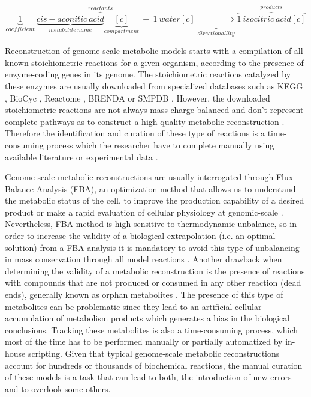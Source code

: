 \begin{equation}
\label{eq:biochemicalReaction}
\overbrace{\underbrace{1}_{coefficient}\ \underbrace{cis-aconitic\ acid}_{metabolite\ name}\underbrace{[c]}_{compartment}\ +\ 1\ water[c]}^{reactants} \underbrace{\Rightarrow}_{directionallity} \overbrace{1\ isocitric\ acid[c]}^{products}
\end{equation}

Reconstruction of genome-scale metabolic models starts with a compilation of all known stoichiometric reactions for a given organism, according to the presence of enzyme-coding genes in its genome. The stoichiometric reactions catalyzed by these enzymes are usually downloaded from specialized databases such as KEGG \citep{Kanehisa2000}, BioCyc \citep{Caspi2014}, Reactome \citep{Croft2014}, BRENDA \citep{Chang2015} or SMPDB \citep{Jewison2014}. However, the downloaded stoichiometric reactions are not always mass-charge balanced and don't represent complete pathways as to construct a high-quality metabolic reconstruction \citep{Thiele2010, Gevorgyan2008}. Therefore the identification and curation of these type of reactions is a time-consuming process which  the researcher have to complete manually using available literature or experimental data \citep{Lakshmanan2014}.

Genome-scale metabolic reconstructions are usually interrogated through Flux Balance Analysis (FBA), an optimization method that allows us to understand the metabolic status of the cell, to improve the production capability of a desired product or make a rapid evaluation of cellular physiology at genomic-scale \citep{Kim2008, Park2009}. Nevertheless, FBA method is high sensitive to thermodynamic unbalance, so in order to increase the validity of a biological extrapolation (i.e. an optimal solution) from a FBA analysis it is mandatory to avoid this type of unbalancing in mass conservation through all model reactions \citep{Reznik2013}. Another drawback when determining  the validity of a metabolic reconstruction is the presence of  reactions with compounds that are not produced or consumed in any other reaction (dead ends), generally known as orphan metabolites  \citep{Park2009, Thiele2010}. The presence of this type of metabolites can be problematic since they lead to an artificial cellular accumulation of metabolism products which generates a bias in the biological conclusions. Tracking these metabolites is also a time-consuming process, which most of the time has to be performed manually or partially automatized by in-house scripting. Given that typical genome-scale metabolic reconstructions account for hundreds or thousands of biochemical reactions, the manual curation of these models is a task that can lead to both, the introduction of new errors and to overlook some others.

